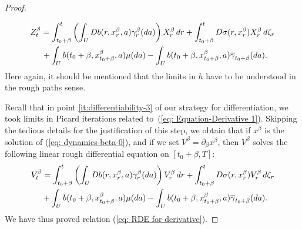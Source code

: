 \documentclass[12pt,reqno]{amsart}
\numberwithin{equation}{section}  %
\newcommand{\1}{{\bf 1}}
\newcommand{\2}{{\bf 2}}
\newcommand{\ga}{\gamma}
\newcommand{\lp}{\left(}
\newcommand{\rp}{\right)}
\theoremstyle{remark}
\theoremstyle{remark}
\begin{document}
\begin{proof}
\begin{enumerate}[wide, labelwidth=!, labelindent=0pt, label=\emph{(\roman*)}]
\begin{multline}\label{eq: Equation-Derivative 1}
Z^{\beta}_{t}=\int_{t_{0}+\beta}^{t}\lp\int_{U}Db(r,x_{r}^{\beta},a)\ga_{r}^{\beta}(da) \rp X_{r}^{\beta}\,dr + \int_{t_{0}+\beta}^{t}D\sigma(r,x_{r}^{\beta})X_{r}^{\beta}\,d\zeta_{r}\\
    \hspace{0.25cm}+ \int_{U}b(t_{0}+\beta,x^{\beta}_{t_{0}+\beta},a)\mu(da)-\int_{U}b(t_{0}+\beta,x^{\beta}_{t_{0}+\beta},a)\overline{\ga}_{t_{0}+\beta}(da).
\end{multline}
Here again, it should be mentioned that the limits in $h$ have to be understood in the rough paths sense.
\end{enumerate}

Recall that in point \ref{it:differentiability-3} of our strategy for differentiation, we took limits in Picard iterations related to~(\ref{eq: Equation-Derivative 1}). Skipping the tedious details for the justification of this step, we obtain that if $x^{\beta}$ is the solution of (\ref{eq: dynamics-beta-0}), and if we set $V^{\beta}=\partial_{\beta}x^{\beta}$, then $V^{\beta}$ solves the following linear rough differential equation on $[t_{0}+\beta,T]$:
\begin{multline}\label{eq: Equation-Derivative 2}
V^{\beta}_{t}=\int_{t_{0}+\beta}^{t}\lp\int_{U}Db(r,x_{r}^{\beta},a)\ga_{r}^{\beta}(da) \rp V_{r}^{\beta}\,dr + \int_{t_{0}+\beta}^{t}D\sigma(r,x_{r}^{\beta})V_{r}^{\beta}\,d\zeta_{r}\\
    \hspace{0.25cm}+ \int_{U}b(t_{0}+\beta,x^{\beta}_{t_{0}+\beta},a)\mu(da)-\int_{U}b(t_{0}+\beta,x^{\beta}_{t_{0}+\beta},a)\overline{\ga}_{t_{0}+\beta}(da).
\end{multline}
We have thus proved relation (\ref{eq: RDE for derivative}).


\end{proof}
\end{document}
